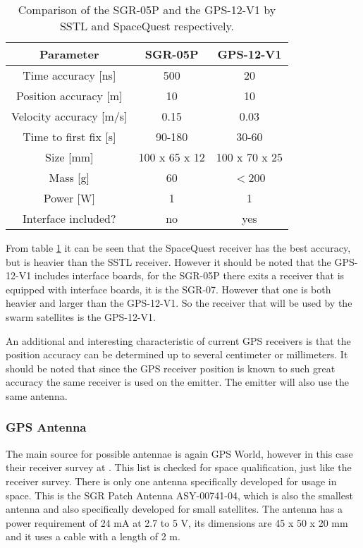 \begin{table}
\centering
\begin{tabular}{c||c|c}
\textbf{Parameter} & \textbf{SGR-05P} & \textbf{GPS-12-V1} \\\hline\hline
	Time accuracy [ns] & 500 & 20 \\
	Position accuracy [m] & 10 & 10 \\
	Velocity accuracy [m/s] & 0.15 & 0.03 \\
	Time to first fix [s] & 90-180 & 30-60 \\
	Size [mm] & 100 x 65 x 12 & 100 x 70 x 25\\
	Mass [g] & 60 & $<$200 \\
	Power [W] & 1 & 1 \\
	Interface included? & no & yes \\
\end{tabular}
\caption{Comparison of the SGR-05P and the GPS-12-V1 by \acs{SSTL} and SpaceQuest respectively.}
\label{comparegps}
\end{table}

From table \ref{comparegps} it can be seen that the SpaceQuest receiver has the best accuracy, but is heavier than the \acs{SSTL} receiver. However it should be noted that the GPS-12-V1 includes interface boards, for the SGR-05P there exits a receiver that is equipped with interface boards, it is the SGR-07. However that one is both heavier and larger than the GPS-12-V1. So the receiver that will be used by the swarm satellites is the GPS-12-V1.

An additional and interesting characteristic of current \acs{GPS} receivers is that the position accuracy can be determined up to several centimeter or millimeters. It should be noted that since the \acs{GPS} receiver position is known to such great accuracy the same receiver is used on the emitter. The emitter will also use the same antenna.

\subsubsection{GPS Antenna}
The main source for possible antennae is again GPS World, however in this case their receiver survey at \cite{SurveyAnt}. This list is checked for space qualification, just like the receiver survey. There is only one antenna specifically developed for usage in space. This is the SGR Patch Antenna ASY-00741-04, which is also the smallest antenna and also specifically developed for small satellites.
The antenna has a power requirement of 24 mA at 2.7 to 5 V, its dimensions are 45 x 50 x 20 mm and it uses a cable with a length of 2 m.